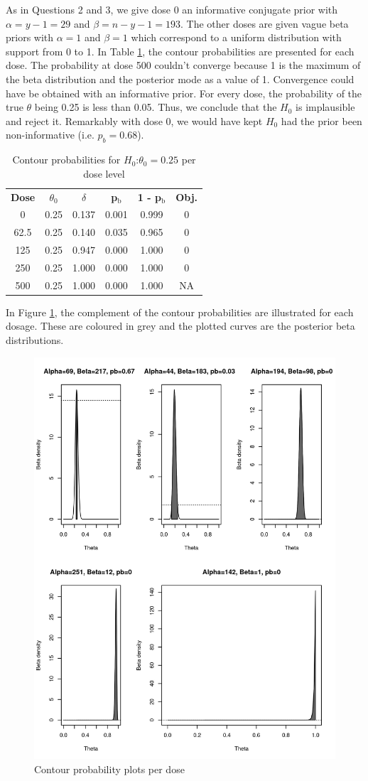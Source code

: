 \documentclass[11pt]{article}
\begin{document}
As in Questions 2 and 3, we give dose 0 an informative conjugate prior
with \(\alpha=y-1=29\) and \(\beta=n-y-1=193\). The other doses are given
vague beta priors with \(\alpha=1\) and \(\beta=1\) which correspond to a
uniform distribution with support from 0 to 1. In Table \ref{tab:org382fe79},
the contour probabilities are presented for each dose. The probability
at dose 500 couldn't converge because 1 is the maximum of the beta
distribution and the posterior mode as a value of 1. Convergence could
have be obtained with an informative prior. For every dose, the
probability of the true \(\theta\) being 0.25 is less than 0.05. Thus,
we conclude that the \(H_0\) is implausible and reject it. Remarkably
with dose 0, we would have kept \(H_{0}\) had the prior been
non-informative (i.e. \(p_b=0.68\)).

\begin{table}[H]
\caption{\label{tab:org382fe79}
Contour probabilities for \(H_0\):\(\theta_0=0.25\) per dose level}
\centering
\begin{tabular}{cccccc}
\hline
\textbf{Dose} & \textbf{\(\theta_0\)} & \textbf{\(\delta\)} & \textbf{p\(_{\text{b}}\)} & \textbf{1 - p\(_{\text{b}}\)} & \textbf{Obj.}\\
0 & 0.25 & 0.137 & 0.001 & 0.999 & 0\\
62.5 & 0.25 & 0.140 & 0.035 & 0.965 & 0\\
125 & 0.25 & 0.947 & 0.000 & 1.000 & 0\\
250 & 0.25 & 1.000 & 0.000 & 1.000 & 0\\
500 & 0.25 & 1.000 & 0.000 & 1.000 & NA\\
\hline
\end{tabular}
\end{table}

In Figure \ref{fig:orgce72a9a}, the complement of the contour probabilities are
illustrated for each dosage. These are coloured in grey and the
plotted curves are the posterior beta distributions.

\begin{figure}[H]
\centering
\includegraphics[width=.5\textwidth]{./q2_contourplots.jpg}
\caption{\label{fig:orgce72a9a}
Contour probability plots per dose}
\end{figure}
\end{document}
